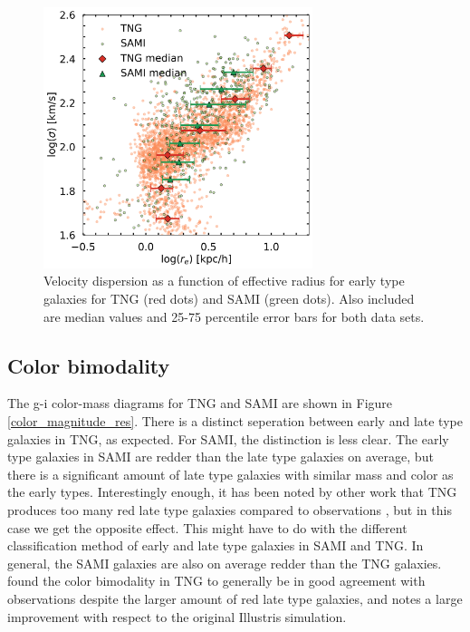 \begin{figure}
    \centering
    \includegraphics[width=0.7\textwidth]{images/results_sigma_radius_FP.png}
    \caption{Velocity dispersion as a function of effective radius for early type galaxies for TNG (red dots) and SAMI (green dots). Also included are median values and 25-75 percentile error bars for both data sets.}
    \label{FP_res2}
\end{figure}

\newpage

\subsection{Color bimodality}
The g-i color-mass diagrams for TNG and SAMI are shown in Figure \ref{color_magnitude_res}. There is a distinct seperation between early and late type galaxies in TNG, as expected. For SAMI, the distinction is less clear. The early type galaxies in SAMI are redder than the late type galaxies on average, but there is a significant amount of late type galaxies with similar mass and color as the early types. Interestingly enough, it has been noted by other work that TNG produces too many red late type galaxies compared to observations \parencite{Nelson2017}, but in this case we get the opposite effect. This might have to do with the different classification method of early and late type galaxies in SAMI and TNG. In general, the SAMI galaxies are also on average redder than the TNG galaxies. \textcite{Nelson2017} found the color bimodality in TNG to generally be in good agreement with observations despite the larger amount of red late type galaxies, and notes a large improvement with respect to the original Illustris simulation.


